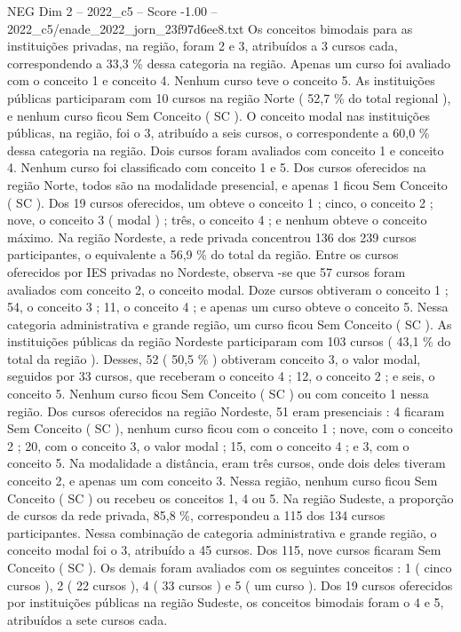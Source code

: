 \begin{textsample}{NEG Dim 2 – 2022\_c5 – Score -1.00 – 2022\_c5/enade\_2022\_jorn\_23f97d6ee8.txt}
Os conceitos bimodais para as instituições privadas, na região, foram 2 e 3, atribuídos a 3 cursos cada, correspondendo a 33,3 \% dessa categoria na região.
Apenas um curso foi avaliado com o conceito 1 e conceito 4.
Nenhum curso teve o conceito 5.
As instituições públicas participaram com 10 cursos na região Norte ( 52,7 \% do total regional ), e nenhum curso ficou Sem Conceito ( SC ).
O conceito modal nas instituições públicas, na região, foi o 3, atribuído a seis cursos, o correspondente a 60,0 \% dessa categoria na região.
Dois cursos foram avaliados com conceito 1 e conceito 4.
Nenhum curso foi classificado com conceito 1 e 5.
Dos cursos oferecidos na região Norte, todos são na modalidade presencial, e apenas 1 ficou Sem Conceito ( SC ).
Dos 19 cursos oferecidos, um obteve o conceito 1 ; cinco, o conceito 2 ; nove, o conceito 3 ( modal ) ; três, o conceito 4 ; e nenhum obteve o conceito máximo.
Na região Nordeste, a rede privada concentrou 136 dos 239 cursos participantes, o equivalente a 56,9 \% do total da região.
Entre os cursos oferecidos por IES privadas no Nordeste, observa -se que 57 cursos foram avaliados com conceito 2, o conceito modal.
Doze cursos obtiveram o conceito 1 ; 54, o conceito 3 ; 11, o conceito 4 ; e apenas um curso obteve o conceito 5.
Nessa categoria administrativa e grande região, um curso ficou Sem Conceito ( SC ).
As instituições públicas da região Nordeste participaram com 103 cursos ( 43,1 \% do total da região ).
Desses, 52 ( 50,5 \% ) obtiveram conceito 3, o valor modal, seguidos por 33 cursos, que receberam o conceito 4 ; 12, o conceito 2 ; e seis, o conceito 5.
Nenhum curso ficou Sem Conceito ( SC ) ou com conceito 1 nessa região.
Dos cursos oferecidos na região Nordeste, 51 eram presenciais : 4 ficaram Sem Conceito ( SC ), nenhum curso ficou com o conceito 1 ; nove, com o conceito 2 ; 20, com o conceito 3, o valor modal ; 15, com o conceito 4 ; e 3, com o conceito 5.
Na modalidade a distância, eram três cursos, onde dois deles tiveram conceito 2, e apenas um com conceito 3.
Nessa região, nenhum curso ficou Sem Conceito ( SC ) ou recebeu os conceitos 1, 4 ou 5.
Na região Sudeste, a proporção de cursos da rede privada, 85,8 \%, correspondeu a 115 dos 134 cursos participantes.
Nessa combinação de categoria administrativa e grande região, o conceito modal foi o 3, atribuído a 45 cursos.
Dos 115, nove cursos ficaram Sem Conceito ( SC ).
Os demais foram avaliados com os seguintes conceitos : 1 ( cinco cursos ), 2 ( 22 cursos ), 4 ( 33 cursos ) e 5 ( um curso ).
Dos 19 cursos oferecidos por instituições públicas na região Sudeste, os conceitos bimodais foram o 4 e 5, atribuídos a sete cursos cada.

\end{textsample}
